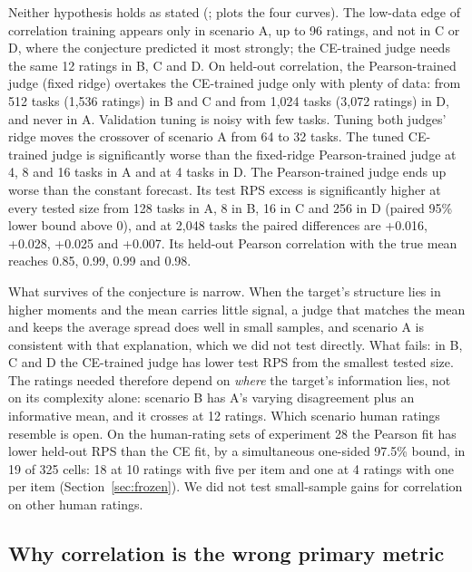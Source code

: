Neither hypothesis holds as stated (;  plots the four curves).
The low-data edge of correlation training appears only in scenario A, up to 96 ratings, and not in C or D, where the conjecture predicted it most strongly; the CE-trained judge needs the same 12 ratings in B, C and D.
On held-out correlation, the Pearson-trained judge (fixed ridge) overtakes the CE-trained judge only with plenty of data: from 512 tasks (1{,}536 ratings) in B and C and from 1{,}024 tasks (3{,}072 ratings) in D, and never in A.
Validation tuning is noisy with few tasks. Tuning both judges' ridge moves the crossover of scenario A from 64 to 32 tasks. The tuned CE-trained judge is significantly worse than the fixed-ridge Pearson-trained judge at 4, 8 and 16 tasks in A and at 4 tasks in D.
The Pearson-trained judge ends up worse than the constant forecast.
Its test RPS excess is significantly higher at every tested size from 128 tasks in A, 8 in B, 16 in C and 256 in D (paired 95\% lower bound above 0), and at 2{,}048 tasks the paired differences are +0.016, +0.028, +0.025 and +0.007.
Its held-out Pearson correlation with the true mean reaches 0.85, 0.99, 0.99 and 0.98.

What survives of the conjecture is narrow.
When the target's structure lies in higher moments and the mean carries little signal, a judge that matches the mean and keeps the average spread does well in small samples, and scenario A is consistent with that explanation, which we did not test directly.
What fails: in B, C and D the CE-trained judge has lower test RPS from the smallest tested size.
The ratings needed therefore depend on \emph{where} the target's information lies, not on its complexity alone: scenario B has A's varying disagreement plus an informative mean, and it crosses at 12 ratings.
Which scenario human ratings resemble is open.
On the human-rating sets of experiment 28 the Pearson fit has lower held-out RPS than the CE fit, by a simultaneous one-sided 97.5\% bound, in 19 of 325 cells: 18 at 10 ratings with five per item and one at 4 ratings with one per item (Section~\ref{sec:frozen}).
We did not test small-sample gains for correlation on other human ratings.

\subsection{Why correlation is the wrong primary metric}
\label{app:controlled-metric}

